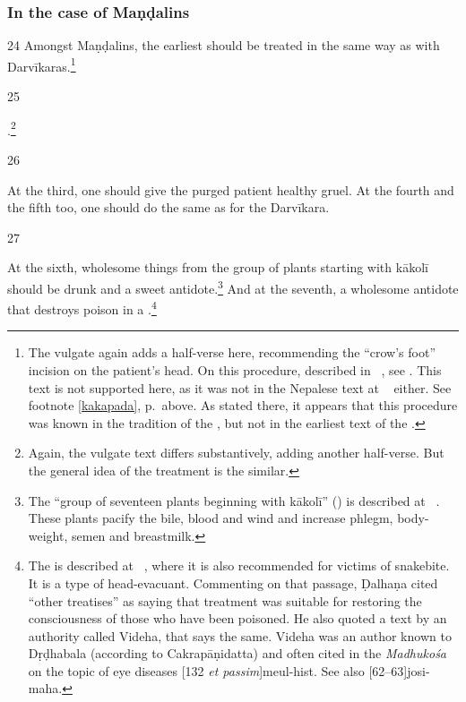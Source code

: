 \begin{translation}
\subsubsection{In the case of Maṇḍalins}

\item [24] Amongst Maṇḍalins, the earliest 
should be treated in the same way as with
Darvīkaras.\footnote{\label{crowsfoot}The vulgate again adds a half-verse
    here, recommending the “crow's foot” incision on the patient's head. On
    this procedure, described in  \CS\ , see
    \cite[145]{wuja-2003}. This text is not supported here, as it was not in
    the Nepalese text at \SS\  either. See footnote
    \ref{kakapada}, p.\,\pageref{kakapada} above.  As stated there, it
    appears that this procedure was known in the tradition of the \CS, but
    not in the earliest text of the \SS.}
    
\item [25]

.\footnote{Again, the vulgate text differs substantively, adding 
another half-verse.  But the general idea of the treatment is the 
similar.}

\item [26]

At the third, one should give the purged patient healthy gruel. At the fourth and 
the fifth too, one should do the same as for the Darvīkara.

\item [27]

At the sixth, wholesome things from the group of plants starting with
\gls{kākolī} should be drunk and a sweet antidote.\footnote{The “group of
    seventeen plants beginning with \gls{kākolī}” () is
    described at \SS\ . These plants pacify the bile,
    blood and wind and increase phlegm, body-weight, semen and breastmilk.}
    And at the seventh, a wholesome antidote that destroys poison in a
    .\footnote{The  is described at
        \SS\ , where it is also recommended for victims of
        snakebite.  It is a type of head-evacuant. Commenting on that passage,
        Ḍalhaṇa cited “other treatises” as saying that  treatment
        was suitable for restoring the consciousness of those who have been
        poisoned.  He also quoted a text by an authority called Videha, that says
        the same.  Videha was an author known to Dṛḍhabala (according to
        Cakrapāṇidatta) and often cited in the \emph{Madhukośa} on the topic of
        eye diseases [132 \emph{et passim}]{meul-hist}. See also
        [62--63]{josi-maha}.}


\end{translation}
